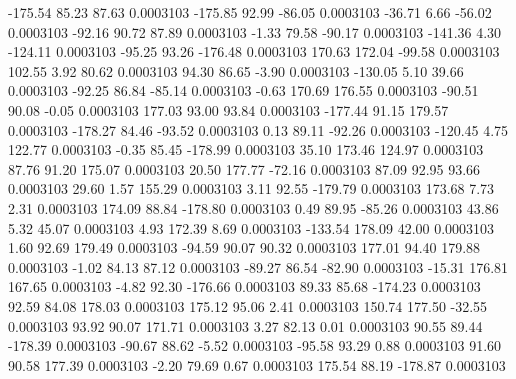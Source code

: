      -175.54       85.23       87.63     0.0003103
     -175.85       92.99      -86.05     0.0003103
      -36.71        6.66      -56.02     0.0003103
      -92.16       90.72       87.89     0.0003103
       -1.33       79.58      -90.17     0.0003103
     -141.36        4.30     -124.11     0.0003103
      -95.25       93.26     -176.48     0.0003103
      170.63      172.04      -99.58     0.0003103
      102.55        3.92       80.62     0.0003103
       94.30       86.65       -3.90     0.0003103
     -130.05        5.10       39.66     0.0003103
      -92.25       86.84      -85.14     0.0003103
       -0.63      170.69      176.55     0.0003103
      -90.51       90.08       -0.05     0.0003103
      177.03       93.00       93.84     0.0003103
     -177.44       91.15      179.57     0.0003103
     -178.27       84.46      -93.52     0.0003103
        0.13       89.11      -92.26     0.0003103
     -120.45        4.75      122.77     0.0003103
       -0.35       85.45     -178.99     0.0003103
       35.10      173.46      124.97     0.0003103
       87.76       91.20      175.07     0.0003103
       20.50      177.77      -72.16     0.0003103
       87.09       92.95       93.66     0.0003103
       29.60        1.57      155.29     0.0003103
        3.11       92.55     -179.79     0.0003103
      173.68        7.73        2.31     0.0003103
      174.09       88.84     -178.80     0.0003103
        0.49       89.95      -85.26     0.0003103
       43.86        5.32       45.07     0.0003103
        4.93      172.39        8.69     0.0003103
     -133.54      178.09       42.00     0.0003103
        1.60       92.69      179.49     0.0003103
      -94.59       90.07       90.32     0.0003103
      177.01       94.40      179.88     0.0003103
       -1.02       84.13       87.12     0.0003103
      -89.27       86.54      -82.90     0.0003103
      -15.31      176.81      167.65     0.0003103
       -4.82       92.30     -176.66     0.0003103
       89.33       85.68     -174.23     0.0003103
       92.59       84.08      178.03     0.0003103
      175.12       95.06        2.41     0.0003103
      150.74      177.50      -32.55     0.0003103
       93.92       90.07      171.71     0.0003103
        3.27       82.13        0.01     0.0003103
       90.55       89.44     -178.39     0.0003103
      -90.67       88.62       -5.52     0.0003103
      -95.58       93.29        0.88     0.0003103
       91.60       90.58      177.39     0.0003103
       -2.20       79.69        0.67     0.0003103
      175.54       88.19     -178.87     0.0003103
